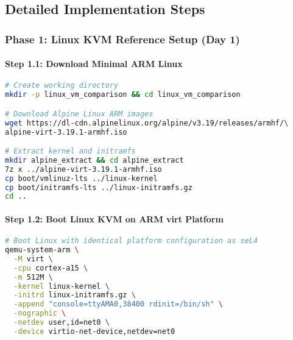 \documentclass[11pt,a4paper]{article}
\begin{document}
\subsection{Detailed Implementation Steps}

\subsubsection{Phase 1: Linux KVM Reference Setup (Day 1)}

\paragraph{Step 1.1: Download Minimal ARM Linux}
\begin{lstlisting}[language=bash]
# Create working directory
mkdir -p linux_vm_comparison && cd linux_vm_comparison

# Download Alpine Linux ARM images
wget https://dl-cdn.alpinelinux.org/alpine/v3.19/releases/armhf/\
alpine-virt-3.19.1-armhf.iso

# Extract kernel and initramfs
mkdir alpine_extract && cd alpine_extract
7z x ../alpine-virt-3.19.1-armhf.iso
cp boot/vmlinuz-lts ../linux-kernel
cp boot/initramfs-lts ../linux-initramfs.gz
cd ..
\end{lstlisting}

\paragraph{Step 1.2: Boot Linux KVM on ARM virt Platform}
\begin{lstlisting}[language=bash]
# Boot Linux with identical platform configuration as seL4
qemu-system-arm \
  -M virt \
  -cpu cortex-a15 \
  -m 512M \
  -kernel linux-kernel \
  -initrd linux-initramfs.gz \
  -append "console=ttyAMA0,38400 rdinit=/bin/sh" \
  -nographic \
  -netdev user,id=net0 \
  -device virtio-net-device,netdev=net0
\end{lstlisting}
\end{document}
